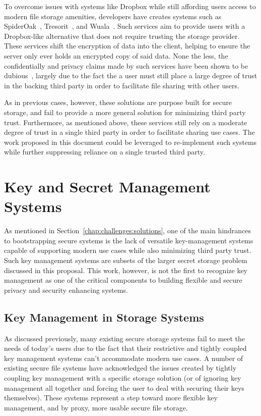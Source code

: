 To overcome issues with systems like Dropbox while still affording
users access to modern file storage amenities, developers have creates
systems such as SpiderOak~\cite{spideroak}, Tresorit~\cite{tresorit},
and Wuala~\cite{wuala}. Such services aim to provide users with a
Dropbox-like alternative that does not require trusting the storage
provider. These services shift the encryption of data into the client,
helping to ensure the server only ever holds an encrypted copy of said
data. None the less, the confidentially and privacy claims made by
such services have been shown to be dubious~\cite{wilson2014}, largely
due to the fact the a user must still place a large degree of trust in
the backing third party in order to facilitate file sharing with other
users.

As in previous cases, however, these solutions are purpose built for
secure storage, and fail to provide a more general solution for
minimizing third party trust. Furthermore, as mentioned above, these
services still rely on a moderate degree of trust in a single third
party in order to facilitate sharing use cases. The work proposed in
this document could be leveraged to re-implement such systems while
further suppressing reliance on a single trusted third party.

\section{Key and Secret Management Systems}
\label{chap:related:keymgmt}

As mentioned in Section~\ref{chap:challenges:solutions}, one of the
main hindrances to bootstrapping secure systems is the lack of
versatile key-management systems capable of supporting modern use
cases while also minimizing third party trust. Such key management
systems are subsets of the larger secret storage problem discussed in
this proposal. This work, however, is not the first to recognize key
management as one of the critical components to building flexible and
secure privacy and security enhancing systems.

\subsection{Key Management in Storage Systems}

As discussed previously, many existing secure storage systems fail to
meet the needs of today's users due to the fact that their restrictive
and tightly coupled key management systems can't accommodate modern
use cases. A number of existing secure file systems have acknowledged
the issues created by tightly coupling key management with a specific
storage solution (or of ignoring key management all together and
forcing the user to deal with securing their keys themselves). These
systems represent a step toward more flexible key management, and by
proxy, more usable secure file storage.

